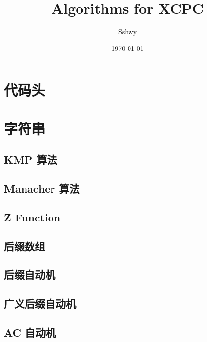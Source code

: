 \documentclass[a4paper,12pt]{article}
\begin{document}
\title{Algorithms for XCPC}
\author{Sshwy}
\date{\today}
\maketitle

\newpage

\tableofcontents
\newpage
{}

\section{代码头}



\section{字符串}

\subsection{KMP 算法}

\subsection{Manacher 算法}

\subsection{Z Function}

\subsection{后缀数组}

\subsection{后缀自动机}

\subsection{广义后缀自动机}

\subsection{AC 自动机}

\end{document}
